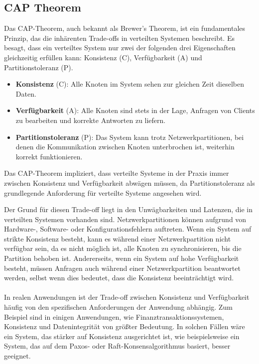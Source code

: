 \subsection{CAP Theorem}
Das CAP-Theorem, auch bekannt als Brewer's Theorem, ist ein fundamentales Prinzip, das die inhärenten Trade-offs in verteilten Systemen beschreibt. Es besagt, dass ein verteiltes System nur zwei der folgenden drei Eigenschaften gleichzeitig erfüllen kann: Konsistenz (C), Verfügbarkeit (A) und Partitionstoleranz (P).
\begin{itemize}
\item \textbf{Konsistenz} (C): Alle Knoten im System sehen zur gleichen Zeit dieselben Daten.
\item \textbf{Verfügbarkeit} (A): Alle Knoten sind stets in der Lage, Anfragen von Clients zu bearbeiten und korrekte Antworten zu liefern.
\item \textbf{Partitionstoleranz} (P): Das System kann trotz Netzwerkpartitionen, bei denen die Kommunikation zwischen Knoten unterbrochen ist, weiterhin korrekt funktionieren.
\end{itemize}

Das CAP-Theorem impliziert, dass verteilte Systeme in der Praxis immer zwischen Konsistenz und Verfügbarkeit abwägen müssen, da Partitionstoleranz als grundlegende Anforderung für verteilte Systeme angesehen wird.

Der Grund für diesen Trade-off liegt in den Unwägbarkeiten und Latenzen, die in verteilten Systemen vorhanden sind. Netzwerkpartitionen können aufgrund von Hardware-, Software- oder Konfigurationsfehlern auftreten. Wenn ein System auf strikte Konsistenz besteht, kann es während einer Netzwerkpartition nicht verfügbar sein, da es nicht möglich ist, alle Knoten zu synchronisieren, bis die Partition behoben ist. Andererseits, wenn ein System auf hohe Verfügbarkeit besteht, müssen Anfragen auch während einer Netzwerkpartition beantwortet werden, selbst wenn dies bedeutet, dass die Konsistenz beeinträchtigt wird.
\\\\
In realen Anwendungen ist der Trade-off zwischen Konsistenz und Verfügbarkeit häufig von den spezifischen Anforderungen der Anwendung abhängig. Zum Beispiel sind in einigen Anwendungen, wie Finanztransaktionssystemen, Konsistenz und Datenintegrität von größter Bedeutung. In solchen Fällen wäre ein System, das stärker auf Konsistenz ausgerichtet ist, wie beispielsweise ein System, das auf dem Paxos- oder Raft-Konsensalgorithmus basiert, besser geeignet.

